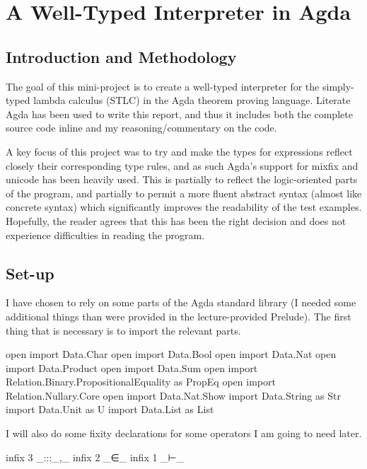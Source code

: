 \documentclass{article}
\begin{document}
\section*{A Well-Typed Interpreter in Agda}
\label{sec:AWell-TypedInterpreterinAgda}

\subsection{Introduction and Methodology}
\label{sub:IntroductionandMethodology}
The goal of this mini-project is to create a well-typed interpreter for the simply-typed lambda calculus (STLC) in the Agda theorem proving language.
Literate Agda\cite{chalmers13literateagda} has been used to write this report, and thus it includes both the complete source code inline and my reasoning/commentary on the code.

A key focus of this project was to try and make the types for expressions reflect closely their corresponding type rules, and as such Agda's support for mixfix and unicode has been heavily used.
This is partially to reflect the logic-oriented parts of the program, and partially to permit a more fluent abstract syntax
(almost like concrete syntax) which significantly improves the readability of the test examples. Hopefully, the reader agrees that this has been the right decision and
does not experience difficulties in reading the program.

\subsection{Set-up}
\label{sub:Set-up}

I have chosen to rely on some parts of the Agda standard library (I needed some additional things than were provided in the
lecture-provided Prelude). The first thing that is necessary is to import the relevant parts.

\begin{code}
  open import Data.Char
  open import Data.Bool
  open import Data.Nat
  open import Data.Product
  open import Data.Sum
  open import Relation.Binary.PropositionalEquality as PropEq
  open import Relation.Nullary.Core
  open import Data.Nat.Show
  import Data.String as Str
  import Data.Unit as U
  import Data.List as List
\end{code}

I will also do some fixity declarations for some operators I am going to need later.

\begin{code}
  infix 3 _:::_,_
  infix 2 _∈_
  infix 1 _⊢_
\end{code}
\end{document}
